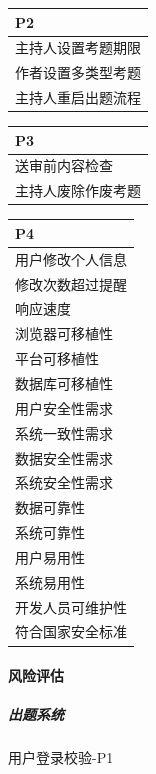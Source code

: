 \documentclass[hyperref, a4paper]{ctexart}
\let\oldparagraph\paragraph
\renewcommand{\paragraph}[1]{\oldparagraph{#1}\mbox{}}
\let\oldsubparagraph\subparagraph
\renewcommand{\subparagraph}[1]{\oldsubparagraph{#1}\mbox{}}
\begin{document}
\begin{tabular}{|p{10cm}|}
\hline
P2\\
\hline
主持人设置考题期限\\
\hline
作者设置多类型考题\\
\hline
主持人重启出题流程\\
\hline
\end{tabular}

\begin{tabular}{|p{10cm}|}
\hline
P3\\
\hline
送审前内容检查\\
\hline
主持人废除作废考题\\
\hline
\end{tabular}

\begin{tabular}{|p{10cm}|}
\hline
P4\\
\hline
用户修改个人信息\\
\hline
修改次数超过提醒\\
\hline
响应速度\\
\hline
浏览器可移植性\\
\hline
平台可移植性\\
\hline
数据库可移植性\\
\hline
用户安全性需求\\
\hline
系统一致性需求\\
\hline
数据安全性需求\\
\hline
系统安全性需求\\
\hline
数据可靠性\\
\hline
系统可靠性\\
\hline
用户易用性\\
\hline
系统易用性\\
\hline
开发人员可维护性\\
\hline
符合国家安全标准\\
\hline
\end{tabular}

\hypertarget{ux98ceux9669ux8bc4ux4f30}{%
\paragraph{风险评估}\label{ux98ceux9669ux8bc4ux4f30}}

\hypertarget{ux51faux9898ux7cfbux7edf-2}{%
\subparagraph{出题系统}\label{ux51faux9898ux7cfbux7edf-2}}

用户登录校验-P1
\end{document}
